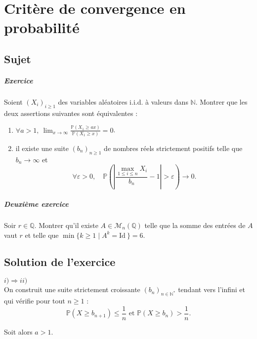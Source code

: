 \chapter{Critère de convergence en probabilité}

\section{Sujet}

\paragraph{Exercice}

Soient $(X_i)_{i\geqslant 1}$ des variables aléatoires i.i.d. à valeurs dans $\mathbb N$. Montrer que les deux assertions suivantes sont équivalentes :
\begin{enumerate}[label=(\arabic*)]
    \item $\displaystyle\forall a >1,\  \lim_{x\to\infty} \frac{\mathbb P(X_1 \geqslant ax)}{\mathbb P(X_1 \geqslant x)}=0$.
    \item il existe une suite $(b_n)_{n\geqslant 1}$ de nombres réels strictement positifs telle que $b_n \to \infty$ et
    \[
        \forall \varepsilon > 0,\quad \mathbb P\left(\left|\frac{\max_{1\leqslant i\leqslant n} X_i}{b_n} - 1 \right| > \varepsilon\right) \to 0.
    \]
\end{enumerate}

\paragraph{Deuxième exercice}
Soir $r \in \mathbb Q.$ Montrer qu'il existe $A \in \mathcal M_n(\mathbb Q)$ telle que la somme des entrées de $A$ vaut $r$ et telle que $\min \{k\geqslant 1 \mid A^k = \mathrm{Id}\: \} =6.$

\section{Solution de l'exercice} %

$\boxed{i)\Longrightarrow ii)}$\\

On construit une suite strictement croissante $\displaystyle (b_{n})_{n\in\mathbb{N}^{*}}$ tendant vers l'infini et qui vérifie pour tout $n\geq 1$ : $$\mathbb{P}(X\geq b_{n+1})\leq \frac{1}{n} \mbox{ et }\mathbb{P}(X\geq b_{n})>\frac{1}{n}.$$

Soit alors $a>1.$ 

